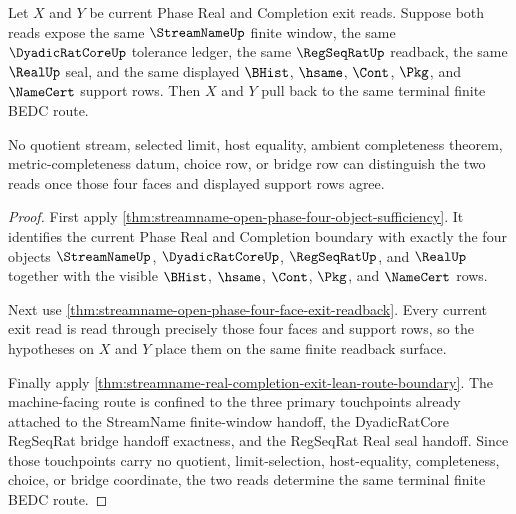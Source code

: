 \begin{theorem}
\label{thm:streamname-real-completion-four-face-terminal-pullback}
Let $X$ and $Y$ be current Phase Real and Completion exit reads. Suppose both reads expose the same $\StreamNameUp$ finite window, the same $\DyadicRatCoreUp$ tolerance ledger, the same $\RegSeqRatUp$ readback, the same $\RealUp$ seal, and the same displayed $\BHist$, $\hsame$, $\Cont$, $\Pkg$, and $\NameCert$ support rows. Then $X$ and $Y$ pull back to the same terminal finite BEDC route.

No quotient stream, selected limit, host equality, ambient completeness theorem, metric-completeness datum, choice row, or bridge row can distinguish the two reads once those four faces and displayed support rows agree.
\end{theorem}
\begin{proof}
First apply \autoref{thm:streamname-open-phase-four-object-sufficiency}. It identifies the current Phase Real and Completion boundary with exactly the four objects $\StreamNameUp$, $\DyadicRatCoreUp$, $\RegSeqRatUp$, and $\RealUp$ together with the visible $\BHist$, $\hsame$, $\Cont$, $\Pkg$, and $\NameCert$ rows.

Next use \autoref{thm:streamname-open-phase-four-face-exit-readback}. Every current exit read is read through precisely those four faces and support rows, so the hypotheses on $X$ and $Y$ place them on the same finite readback surface.

Finally apply \autoref{thm:streamname-real-completion-exit-lean-route-boundary}. The machine-facing route is confined to the three primary touchpoints already attached to the StreamName finite-window handoff, the DyadicRatCore RegSeqRat bridge handoff exactness, and the RegSeqRat Real seal handoff. Since those touchpoints carry no quotient, limit-selection, host-equality, completeness, choice, or bridge coordinate, the two reads determine the same terminal finite BEDC route.
\end{proof}

